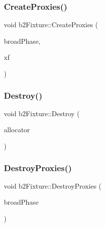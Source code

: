 \mbox{\label{classb2_fixture_a670f1f687521666da6e92885754970b7}} 
\subsubsection{\texorpdfstring{CreateProxies()}{CreateProxies()}}
{\footnotesize\ttfamily void b2\+Fixture\+::\+Create\+Proxies (\begin{DoxyParamCaption}\item[{\mbox{\hyperlink{classb2_broad_phase}{b2\+Broad\+Phase}} $\ast$}]{broad\+Phase,  }\item[{const \mbox{\hyperlink{structb2_transform}{b2\+Transform}} \&}]{xf }\end{DoxyParamCaption})\hspace{0.3cm}{\ttfamily [protected]}}

\mbox{\label{classb2_fixture_a279301181668f724c027020a654efe42}} 
\subsubsection{\texorpdfstring{Destroy()}{Destroy()}}
{\footnotesize\ttfamily void b2\+Fixture\+::\+Destroy (\begin{DoxyParamCaption}\item[{\mbox{\hyperlink{classb2_block_allocator}{b2\+Block\+Allocator}} $\ast$}]{allocator }\end{DoxyParamCaption})\hspace{0.3cm}{\ttfamily [protected]}}

\mbox{\label{classb2_fixture_a1def068c9ce09e2ebcccc556951b7979}} 
\subsubsection{\texorpdfstring{DestroyProxies()}{DestroyProxies()}}
{\footnotesize\ttfamily void b2\+Fixture\+::\+Destroy\+Proxies (\begin{DoxyParamCaption}\item[{\mbox{\hyperlink{classb2_broad_phase}{b2\+Broad\+Phase}} $\ast$}]{broad\+Phase }\end{DoxyParamCaption})\hspace{0.3cm}{\ttfamily [protected]}}

